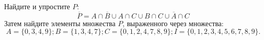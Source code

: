 \question
Найдите и упростите $P$:
\begin{equation*}
\overline{P} = A \cap \overline{B} \cup A \cap C \cup B \cap C \cup \overline{A} \cap C
\end{equation*}
Затем найдите элементы множества $P$, выраженного через множества:
\begin{equation*}
	A = \{0, 3, 4, 9\}; 
	B = \{1, 3, 4, 7\};
	C = \{0, 1, 2, 4, 7, 8, 9\};
	I = \{0, 1, 2, 3, 4, 5, 6, 7, 8, 9\}.
\end{equation*}